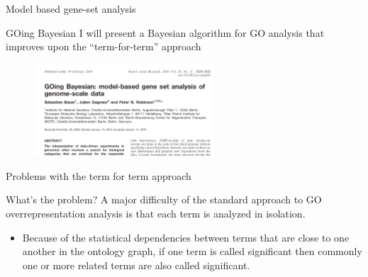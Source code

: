 \documentclass{beamer}
\begin{document}




\begin{frame}{Model based gene-set analysis}
\begin{mybluebox}{GOing Bayesian}
I will present a Bayesian algorithm for GO analysis that improves upon the ``term-for-term'' approach~\cite{Bauer2010}
\end{mybluebox}

\begin{figure}
\centering
\includegraphics[width=0.6\textwidth]{./img/GOingBayesian-title.png}
\end{figure}


\end{frame}

\begin{frame}{Problems with the term for term approach}
 \begin{mybluebox}{What's the problem?}
A major difficulty of the
standard approach to GO overrepresentation analysis is that each term
is analyzed in isolation. 
 \end{mybluebox}
\begin{itemize}
 \item  Because of the statistical dependencies
between terms that are close to one another in the ontology graph, if
one term is called significant then commonly one or more related
terms are also called significant.
\end{itemize}


\end{frame}
\end{document}
